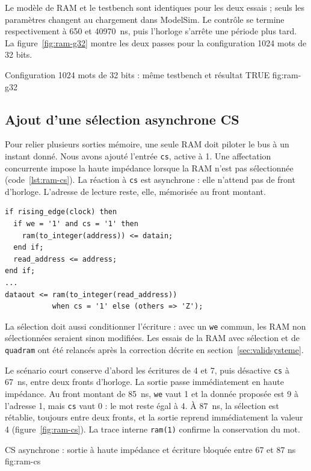 Le modèle de RAM et le testbench sont identiques pour les deux essais ; seuls les
paramètres changent au chargement dans ModelSim. Le contrôle se termine respectivement
à 650 et 40970~ns, puis l'horloge s'arrête une période plus tard. La
figure~\ref{fig:ram-g32} montre les deux passes pour la configuration 1024 mots de 32 bits.

{Configuration 1024 mots de 32 bits : même testbench et résultat TRUE}
{fig:ram-g32}

\subsection{Ajout d'une sélection asynchrone CS}

Pour relier plusieurs sorties mémoire, une seule RAM doit piloter le bus à un instant
donné. Nous avons ajouté l'entrée \texttt{cs}, active à 1. Une
affectation concurrente impose la haute impédance lorsque la RAM n'est pas sélectionnée
(code~\ref{lst:ram-cs}). La réaction à \texttt{cs} est asynchrone : elle n'attend pas
de front d'horloge. L'adresse de lecture reste, elle, mémorisée au front montant.

\noindent\begin{minipage}{\linewidth}
\begin{lstlisting}[style=vhdl, caption={Sélection des écritures et commande de la sortie}, label={lst:ram-cs}]
if rising_edge(clock) then
  if we = '1' and cs = '1' then
    ram(to_integer(address)) <= datain;
  end if;
  read_address <= address;
end if;
...
dataout <= ram(to_integer(read_address))
           when cs = '1' else (others => 'Z');
\end{lstlisting}
\end{minipage}\par

La sélection doit aussi conditionner l'écriture : avec un \texttt{we} commun, les RAM
non sélectionnées seraient sinon modifiées. Les essais de la RAM avec sélection et de
\texttt{quadram} ont été relancés après la correction décrite en
section~\ref{sec:validsysteme}.

Le scénario court conserve d'abord les écritures de 4 et 7, puis désactive \texttt{cs}
à 67~ns, entre deux fronts d'horloge. La sortie passe immédiatement en haute impédance.
Au front montant de 85~ns, \texttt{we} vaut 1 et la donnée proposée est 9 à l'adresse 1,
mais \texttt{cs} vaut 0 : le mot reste égal à 4. À 87~ns, la sélection est rétablie,
toujours entre deux fronts, et la sortie reprend immédiatement la valeur 4
(figure~\ref{fig:ram-cs}). La trace interne \texttt{ram(1)} confirme la conservation du mot.

{CS asynchrone : sortie à haute impédance et écriture bloquée entre 67 et 87 ns}
{fig:ram-cs}
